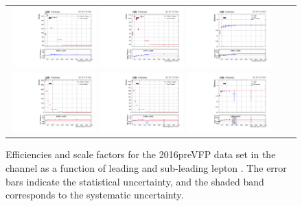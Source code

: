 {\begin{figure}[h]
  \begin{center}
    \begin{tabular}{ccc}
      \includegraphics[width=0.32\textwidth]{fig_2016preVFP_TrigSF/g_lepApt_ee_MC.pdf}
      \includegraphics[width=0.32\textwidth]{fig_2016preVFP_TrigSF/g_lepApt_ee_data.pdf}
      \includegraphics[width=0.32\textwidth]{fig_2016preVFP_TrigSF/g_ee_lepApt_FullSystUncBand.pdf}\\
      \includegraphics[width=0.32\textwidth]{fig_2016preVFP_TrigSF/g_lepBpt_ee_MC.pdf}
      \includegraphics[width=0.32\textwidth]{fig_2016preVFP_TrigSF/g_lepBpt_ee_data.pdf}
      \includegraphics[width=0.32\textwidth]{fig_2016preVFP_TrigSF/g_ee_lepBpt_FullSystUncBand.pdf}\\
    \end{tabular}
    \caption{Efficiencies and scale factors for the 2016preVFP data set in the \ee channel as a function of leading and sub-leading lepton \pT.
            The error bars indicate the statistical uncertainty, and the shaded band corresponds to the systematic uncertainty.
            }
    \label{TrigSF_2016preVFP_2}
  \end{center}
\end{figure}

}
